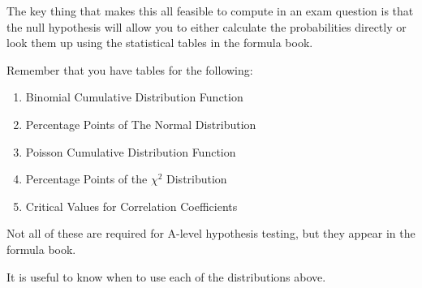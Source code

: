 The key thing that makes this all feasible to compute in an exam question is that the null hypothesis will allow you to either calculate the probabilities directly or look them up using the statistical tables in the formula book.

Remember that you have tables for the following:

\begin{enumerate}
    \item Binomial Cumulative Distribution Function
    \item Percentage Points of The Normal Distribution 
    \item Poisson Cumulative Distribution Function
    \item Percentage Points of the $\chi^2$ Distribution
    \item Critical Values for Correlation Coefficients
\end{enumerate}

Not all of these are required for A-level hypothesis testing, but they appear in the formula book.

It is useful to know when to use each of the distributions above.


